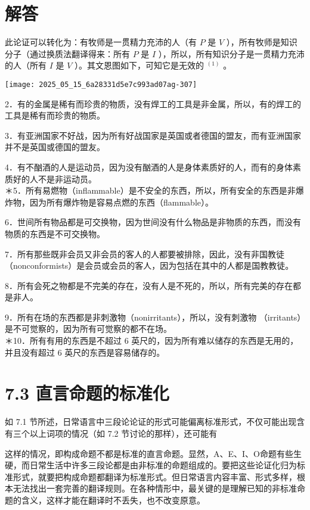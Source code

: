 \section*{解答}
此论证可以转化为：有牧师是一贯精力充沛的人（有 $P$ 是 $V$ ），所有牧师是知识分子（通过换质法翻译得来：所有 $P$ 是 $I$ ），所以，所有知识分子是一贯精力充沛的人（所有 $I$ 是 $V$ ）。其文恩图如下，可知它是无效的 ${ }^{(1)}$ 。

\texttt{[image: 2025\_05\_15\_6a28331d5e7c993ad07ag-307]}

2．有的金属是稀有而珍贵的物质，没有焊工的工具是非金属，所以，有的焊工的工具是稀有而珍贵的物质。

3．有亚洲国家不好战，因为所有好战国家是英国或者德国的盟友，而有亚洲国家并不是英国或德国的盟友。

4．有不酗酒的人是运动员，因为没有酗酒的人是身体素质好的人，而有的身体素质好的人不是非运动员。\\
＊5．所有易燃物（inflammable）是不安全的东西，所以，所有安全的东西是非爆炸物，因为所有爆炸物是容易点燃的东西（flammable）。

6．世间所有物品都是可交换物，因为世间没有什么物品是非物质的东西，而没有物质的东西是不可交换物。

7．所有那些既非会员又非会员的客人的人都要被排除，因此，没有非国教徒（nonconformists）是会员或会员的客人，因为包括在其中的人都是国教教徒。

8．所有会死之物都是不完美的存在，没有人是不死的，所以，所有完美的存在都是非人。

9．所有在场的东西都是非刺激物（nonirritants），所以，没有刺激物 （irritants）是不可觉察的，因为所有可觉察的都不在场。\\
＊10．所有有用的东西是不超过 6 英尺的，因为所有难以储存的东西是无用的，并且没有超过 6 英尺的东西是容易储存的。

\section*{7.3 直言命题的标准化}
如 7.1 节所述，日常语言中三段论论证的形式可能偏离标准形式，不仅可能出现含有三个以上词项的情况（如 7.2 节讨论的那样），还可能有

这样的情况，即构成命题不都是标准的直言命题。显然，A、E、I、O命题有些生硬，而日常生活中许多三段论都是由非标准的命题组成的。要把这些论证化归为标准形式，就要把构成命题都翻译为标准形式。但日常语言内容丰富、形式多样，根本无法找出一套完善的翻译规则。在各种情形中，最关键的是理解已知的非标准命题的含义，这样才能在翻译时不丢失，也不改变原意。

